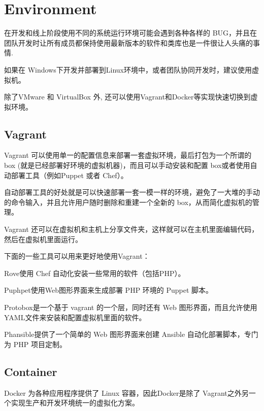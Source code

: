 \chapter{Environment}

在开发和线上阶段使用不同的系统运行环境可能会遇到各种各样的 BUG，并且在团队开发时让所有成员都保持使用最新版本的软件和类库也是一件很让人头痛的事情.

如果在 Windows下开发并部署到Linux环境中，或者团队协同开发时，建议使用虚拟机。



除了VMware 和 VirtualBox 外, 还可以使用Vagrant和Docker等实现快速切换到虚拟环境。


\section{Vagrant}

Vagrant 可以使用单一的配置信息来部署一套虚拟环境，最后打包为一个所谓的 box (就是已经部署好环境的虚拟机器)，而且可以手动安装和配置 box或者使用自动部署工具（例如Puppet 或者 Chef）。

自动部署工具的好处就是可以快速部署一套一模一样的环境，避免了一大堆的手动的命令输入，并且允许用户随时删除和重建一个全新的 box，从而简化虚拟机的管理。

Vagrant 还可以在虚拟机和主机上分享文件夹，这样就可以在主机里面编辑代码，然后在虚拟机里面运行。

下面的一些工具可以用来更好地使用Vagrant：

\begin{compactitem}
\item Rove使用 Chef 自动化安装一些常用的软件（包括PHP）。
\item Puphpet使用Web图形界面来生成部署 PHP 环境的 Puppet 脚本。
\item Protobox是一个基于 vagrant 的一个层，同时还有 Web 图形界面，而且允许使用YAML文件来安装和配置虚拟机里面的软件。
\item Phansible提供了一个简单的 Web 图形界面来创建 Ansible 自动化部署脚本，专门为 PHP 项目定制。
\end{compactitem}




\section{Container}


Docker 为各种应用程序提供了 Linux 容器，因此Docker是除了 Vagrant之外另一个实现生产和开发环境统一的虚拟化方案。

